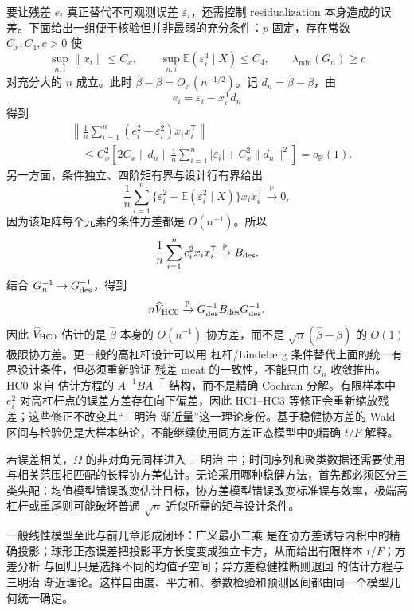 \begin{proposition}[残差外积替代误差外积的一致性]
要让残差 $e_i$ 真正替代不可观测误差 $\varepsilon_i$，还需控制 residualization 本身造成的误差。下面给出一组便于核验但并非最弱的充分条件：$p$ 固定，存在常数 $C_x,C_4,c>0$ 使
\[
 \sup_{n,i}\|x_i\|\le C_x,
 \qquad
 \sup_{n,i}\mathbb E(\varepsilon_i^4\mid X)\le C_4,
 \qquad
 \lambda_{\min}(G_n)\ge c
\]
对充分大的 $n$ 成立。此时 $\widehat\beta-\beta=O_{\mathbb P}(n^{-1/2})$。记 $d_n=\widehat\beta-\beta$，由
\[
 e_i=\varepsilon_i-x_i^{\mathsf T}d_n
\]
得到
\begin{align*}
 &\left\|
 \frac1n\sum_{i=1}^n
 (e_i^2-\varepsilon_i^2)x_ix_i^{\mathsf T}
 \right\|\\
 &\quad\le
 C_x^2\left[
 2C_x\|d_n\|\frac1n\sum_{i=1}^n|\varepsilon_i|
 +C_x^2\|d_n\|^2
 \right]
 =o_{\mathbb P}(1).
\end{align*}
另一方面，条件独立、四阶矩有界与设计行有界给出
\[
 \frac1n\sum_{i=1}^n
 \{\varepsilon_i^2-\mathbb E(\varepsilon_i^2\mid X)\}
 x_ix_i^{\mathsf T}
 \xrightarrow{\mathbb P}0,
\]
因为该矩阵每个元素的条件方差都是 $O(n^{-1})$。所以
\[
 \frac1n\sum_{i=1}^ne_i^2x_ix_i^{\mathsf T}
 \xrightarrow{\mathbb P} B_{\rm des}.
\]
结合 $G_n^{-1}\to G_{\rm des}^{-1}$，得到
\[
 n\widehat V_{\rm HC0}
 \xrightarrow{\mathbb P}
 G_{\rm des}^{-1}B_{\rm des}G_{\rm des}^{-1}.
\]
因此 $\widehat V_{\rm HC0}$ 估计的是 $\widehat\beta$ 本身的 $O(n^{-1})$ 协方差，而不是 $\sqrt n(\widehat\beta-\beta)$ 的 $O(1)$ 极限协方差。更一般的高杠杆设计可以用 杠杆/Lindeberg 条件替代上面的统一有界设计条件，但必须重新验证 残差 meat 的一致性，不能只由 $G_n$ 收敛推出。HC0 来自  估计方程的 $A^{-1}BA^{-\mathsf T}$ 结构，而不是精确 Cochran 分解。有限样本中 $e_i^2$ 对高杠杆点的误差方差存在向下偏差，因此 HC1--HC3 等修正会重新缩放残差；这些修正不改变其“三明治 渐近量”这一理论身份。基于稳健协方差的 Wald 区间与检验仍是大样本结论，不能继续使用同方差正态模型中的精确 $t/F$ 解释。
\end{proposition}

\begin{note}[相关误差与三类模型失配]
若误差相关，$\Omega$ 的非对角元同样进入 三明治 中；时间序列和聚类数据还需要使用与相关范围相匹配的长程协方差估计。无论采用哪种稳健方法，首先都必须区分三类失配：均值模型错误改变估计目标，协方差模型错误改变标准误与效率，极端高杠杆或重尾则可能破坏普通 $\sqrt n$ 近似所需的矩与设计条件。
\end{note}

一般线性模型至此与前几章形成闭环：广义最小二乘 是在协方差诱导内积中的精确投影；球形正态误差把投影平方长度变成独立卡方，从而给出有限样本 $t/F$；方差分析 与回归只是选择不同的均值子空间；异方差稳健推断则退回  的估计方程与 三明治 渐近理论。这样自由度、平方和、参数检验和预测区间都由同一个模型几何统一确定。

